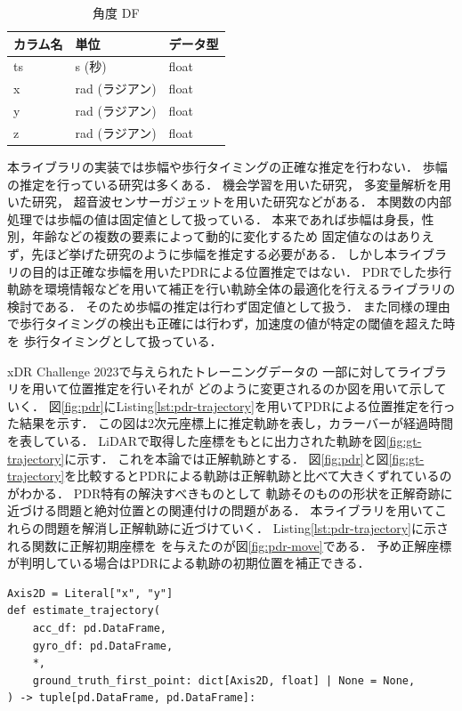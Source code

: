 \begin{table}[ht]
	\centering
	\begin{tabular}{lll}
		\toprule
		カラム名 & 単位         & データ型  \\
		\midrule
		ts   & s (秒)      & float \\
		x    & rad (ラジアン) & float \\
		y    & rad (ラジアン) & float \\
		z    & rad (ラジアン) & float \\
		\bottomrule
	\end{tabular}
	\caption{角度 DF}
\end{table}


本ライブラリの実装では歩幅や歩行タイミングの正確な推定を行わない．
歩幅の推定を行っている研究は多くある．
機会学習を用いた研究\cite{stride-length-auto-learning}，
多変量解析を用いた研究\cite{stride-length-multi}，
超音波センサーガジェットを用いた研究\cite{stride-length-ultrasonic}などがある．
本関数の内部処理では歩幅の値は固定値として扱っている．
本来であれば歩幅は身長，性別，年齢などの複数の要素によって動的に変化するため
固定値なのはありえず，先ほど挙げた研究のように歩幅を推定する必要がある．
しかし本ライブラリの目的は正確な歩幅を用いたPDRによる位置推定ではない．
PDRでした歩行軌跡を環境情報などを用いて補正を行い軌跡全体の最適化を行えるライブラリの検討である．
そのため歩幅の推定は行わず固定値として扱う．
また同様の理由で歩行タイミングの検出も正確には行わず，加速度の値が特定の閾値を超えた時を
歩行タイミングとして扱っている．

xDR Challenge 2023で与えられたトレーニングデータの
一部に対してライブラリを用いて位置推定を行いそれが
どのように変更されるのか図を用いて示していく．
図\ref{fig:pdr}にListing\ref{lst:pdr-trajectory}を用いてPDRによる位置推定を行った結果を示す．
この図は2次元座標上に推定軌跡を表し，カラーバーが経過時間を表している．
LiDARで取得した座標をもとに出力された軌跡を図\ref{fig:gt-trajectory}に示す．
これを本論では正解軌跡とする．
図\ref{fig:pdr}と図\ref*{fig:gt-trajectory}を比較するとPDRによる軌跡は正解軌跡と比べて大きくずれているのがわかる．
PDR特有の解決すべきものとして
軌跡そのものの形状を正解奇跡に近づける問題と絶対位置との関連付けの問題がある．
本ライブラリを用いてこれらの問題を解消し正解軌跡に近づけていく．
Listing\ref{lst:pdr-trajectory}に示される関数に正解初期座標を
を与えたのが図\ref{fig:pdr-move}である．
予め正解座標が判明している場合はPDRによる軌跡の初期位置を補正できる．

\begin{lstlisting}[caption={基本PDR}, label=lst:pdr-trajectory]
Axis2D = Literal["x", "y"]
def estimate_trajectory(
    acc_df: pd.DataFrame,
    gyro_df: pd.DataFrame,
    *,
    ground_truth_first_point: dict[Axis2D, float] | None = None,
) -> tuple[pd.DataFrame, pd.DataFrame]:
\end{lstlisting}

